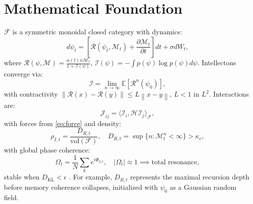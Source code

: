 \documentclass[11pt]{article}
\newcommand{\field}[1]{\mathcal{#1}}
\newcommand{\intellecton}{\mathcal{I}}
\newcommand{\expect}{\mathbb{E}}
\newcommand{\norm}[1]{\left\| #1 \right\|}
\newcommand{\inner}[2]{\langle #1, #2 \rangle}
\newcommand{\dkl}{D_{\text{KL}}}
\begin{document}
\section{Mathematical Foundation}
\label{sec:math}
$\field{F}$ is a symmetric monoidal closed category with dynamics:
\begin{equation}
d\psi_t = \left[ \mathcal{R}(\psi_t, \mathcal{M}_t) + \frac{\partial \mathcal{M}_t}{\partial t} \right] dt + \sigma dW_t,
\label{eq:field}
\end{equation}
where $\mathcal{R}(\psi, \mathcal{M}) = \frac{\alpha(t) \psi \mathcal{M}_t}{1 + \mathcal{I}(\psi)}$, $\mathcal{I}(\psi) = -\int p(\psi) \log p(\psi) d\psi$. Intellectons converge via:
\begin{equation}
\intellecton = \lim_{n \to \infty} \expect[\mathcal{R}^n(\psi_0)],
\label{eq:intellecton}
\end{equation}
with contractivity $\norm{\mathcal{R}(x) - \mathcal{R}(y)} \leq L \norm{x - y}$, $L < 1$ in $L^2$. Interactions are:
\begin{equation}
\mathcal{J}_{ij} = \inner{\intellecton_i}{\mathcal{H} \intellecton_j}_{\field{F}},
\label{eq:interaction}
\end{equation}
with forces from \eqref{eq:force} and density:
\begin{equation}
\rho_{I,t} = \frac{D_{R,t}}{\text{vol}(\field{F})}, \quad D_{R,t} = \sup \{ n : \mathcal{M}^n_t < \infty \} > \kappa_c,
\label{eq:density}
\end{equation}
with global phase coherence:
\begin{equation}
\Omega_t = \frac{1}{N} \sum_k e^{i \Phi_{k,t}}, \quad |\Omega_t| \approx 1 \implies \text{total resonance},
\label{eq:phase}
\end{equation}
stable when $\dkl < \epsilon$ \citep{couzin2023}. For example, $D_{R,t}$ represents the maximal recursion depth before memory coherence collapses, initialized with $\psi_0$ as a Gaussian random field.
\end{document}

